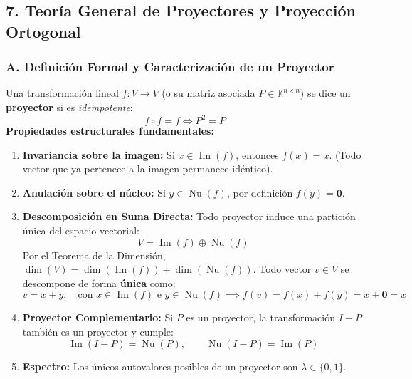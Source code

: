 \documentclass[11pt,a4paper]{article}
\begin{document}
\subsection*{7. Teoría General de Proyectores y Proyección Ortogonal}

\subsubsection*{A. Definición Formal y Caracterización de un Proyector}
Una transformación lineal $f: V \to V$ (o su matriz asociada $P \in \mathbb{K}^{n \times n}$) se dice un \textbf{proyector} si es \emph{idempotente}:
\[
f \circ f = f \iff P^2 = P
\]
\textbf{Propiedades estructurales fundamentales:}
\begin{enumerate}
    \item \textbf{Invariancia sobre la imagen:} Si $x \in \operatorname{Im}(f)$, entonces $f(x) = x$. (Todo vector que ya pertenece a la imagen permanece idéntico).
    \item \textbf{Anulación sobre el núcleo:} Si $y \in \operatorname{Nu}(f)$, por definición $f(y) = \mathbf{0}$.
    \item \textbf{Descomposición en Suma Directa:} Todo proyector induce una partición única del espacio vectorial:
    \[
    V = \operatorname{Im}(f) \oplus \operatorname{Nu}(f)
    \]
    Por el Teorema de la Dimensión, $\dim(V) = \dim(\operatorname{Im}(f)) + \dim(\operatorname{Nu}(f))$. Todo vector $v \in V$ se descompone de forma \textbf{única} como:
    \[
    v = x + y, \quad \text{con } x \in \operatorname{Im}(f) \text{ e } y \in \operatorname{Nu}(f) \implies f(v) = f(x) + f(y) = x + \mathbf{0} = x
    \]
    \item \textbf{Proyector Complementario:} Si $P$ es un proyector, la transformación $I - P$ también es un proyector y cumple:
    \[
    \operatorname{Im}(I - P) = \operatorname{Nu}(P), \qquad \operatorname{Nu}(I - P) = \operatorname{Im}(P)
    \]
    \item \textbf{Espectro:} Los únicos autovalores posibles de un proyector son $\lambda \in \{0, 1\}$.
\end{enumerate}
\end{document}
